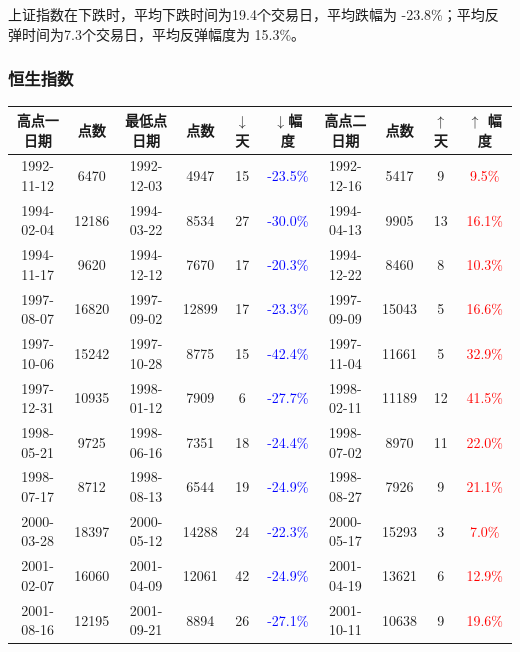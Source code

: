 \documentclass[12pt,a4paper]{article}
\begin{document}
上证指数在下跌时，平均下跌时间为19.4个交易日，平均跌幅为 -23.8\%；平均反弹时间为7.3个交易日，平均反弹幅度为 15.3\%。


\subsubsection{恒生指数}

\begin{table}[H]
\centering  %
\begin{tabular}{|c|c|c|c|c|c|c|c|c|c|}  %
\hline
高点一日期 & 点数 & 最低点日期 & 点数 & $\downarrow$ 天 &$\downarrow$幅度 & 高点二日期 & 点数 & $\uparrow$天& $\uparrow$ 幅度 \\ \hline
1992-11-12 & 6470 & 1992-12-03 & 4947 & 15 & \textcolor{blue}{-23.5\%} & 1992-12-16 & 5417 & 9 & \textcolor{red}{9.5\%}  \\  \hline
1994-02-04 & 12186 & 1994-03-22 & 8534 & 27 & \textcolor{blue}{-30.0\%} & 1994-04-13 & 9905 & 13 & \textcolor{red}{16.1\%}  \\  \hline
1994-11-17 & 9620 & 1994-12-12 & 7670 & 17 & \textcolor{blue}{-20.3\%} & 1994-12-22 & 8460 & 8 & \textcolor{red}{10.3\%}  \\  \hline
1997-08-07 & 16820 & 1997-09-02 & 12899 & 17 & \textcolor{blue}{-23.3\%} & 1997-09-09 & 15043 & 5 & \textcolor{red}{16.6\%}  \\  \hline
1997-10-06 & 15242 & 1997-10-28 & 8775 & 15 & \textcolor{blue}{-42.4\%} & 1997-11-04 & 11661 & 5 & \textcolor{red}{32.9\%}  \\  \hline
1997-12-31 & 10935 & 1998-01-12 & 7909 & 6 & \textcolor{blue}{-27.7\%} & 1998-02-11 & 11189 & 12 & \textcolor{red}{41.5\%}  \\  \hline
1998-05-21 & 9725 & 1998-06-16 & 7351 & 18 & \textcolor{blue}{-24.4\%} & 1998-07-02 & 8970 & 11 & \textcolor{red}{22.0\%}  \\  \hline
1998-07-17 & 8712 & 1998-08-13 & 6544 & 19 & \textcolor{blue}{-24.9\%} & 1998-08-27 & 7926 & 9 & \textcolor{red}{21.1\%}  \\  \hline
2000-03-28 & 18397 & 2000-05-12 & 14288 & 24 & \textcolor{blue}{-22.3\%} & 2000-05-17 & 15293 & 3 & \textcolor{red}{7.0\%}  \\  \hline
2001-02-07 & 16060 & 2001-04-09 & 12061 & 42 & \textcolor{blue}{-24.9\%} & 2001-04-19 & 13621 & 6 & \textcolor{red}{12.9\%}  \\  \hline
2001-08-16 & 12195 & 2001-09-21 & 8894 & 26 & \textcolor{blue}{-27.1\%} & 2001-10-11 & 10638 & 9 & \textcolor{red}{19.6\%}  \\  \hline

\end{tabular}
\end{table}
\end{document}
